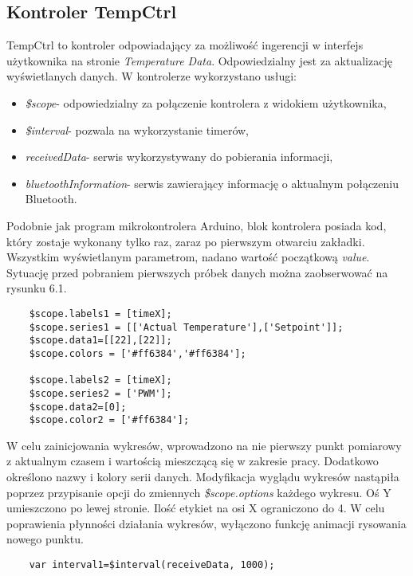 \subsection{Kontroler TempCtrl}%
TempCtrl to kontroler odpowiadający za możliwość ingerencji w interfejs użytkownika na stronie \textit{Temperature Data}. Odpowiedzialny jest za aktualizację wyświetlanych danych. W kontrolerze wykorzystano usługi:
\begin{itemize}
\item \textit{\$scope}- odpowiedzialny za połączenie kontrolera z widokiem użytkownika,
\item \textit{\$interval}- pozwala na wykorzystanie timerów,
\item \textit{receivedData}- serwis wykorzystywany do pobierania informacji,
\item \textit{bluetoothInformation}- serwis zawierający informację o aktualnym połączeniu Bluetooth.
\end{itemize}
Podobnie jak program mikrokontrolera Arduino, blok kontrolera posiada kod, który zostaje wykonany tylko raz, zaraz po pierwszym otwarciu zakładki. Wszystkim wyświetlanym parametrom, nadano wartość początkową \textit{value}. Sytuację przed pobraniem pierwszych próbek danych można zaobserwować na rysunku 6.1.
\lstset{language=Java}
\begin{lstlisting} 
	$scope.labels1 = [timeX];
	$scope.series1 = [['Actual Temperature'],['Setpoint']];
	$scope.data1=[[22],[22]];
	$scope.colors = ['#ff6384','#ff6384'];

	$scope.labels2 = [timeX];
	$scope.series2 = ['PWM'];
	$scope.data2=[0];
	$scope.color2 = ['#ff6384'];
\end{lstlisting}
W celu zainicjowania wykresów, wprowadzono na nie pierwszy punkt pomiarowy z aktualnym czasem i wartością mieszczącą się w zakresie pracy. Dodatkowo określono nazwy i kolory serii danych. Modyfikacja wyglądu wykresów nastąpiła poprzez przypisanie opcji do zmiennych \textit{\$scope.options} każdego wykresu. Oś Y umieszczono po lewej stronie. Ilość etykiet na osi X ograniczono do 4. W celu poprawienia płynności działania wykresów, wyłączono funkcję animacji rysowania nowego punktu.
\begin{lstlisting} 
	var interval1=$interval(receiveData, 1000);
\end{lstlisting}
